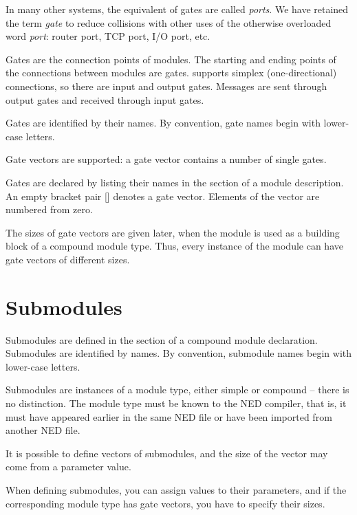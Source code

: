 \begin{note}
    In many other systems, the equivalent of {\opp} gates are called
    \textit{ports}. We have retained the term \textit{gate} to reduce
    collisions with other uses of the otherwise overloaded word
    \textit{port}: router port, TCP port, I/O port, etc.
\end{note}



Gates are the connection points of modules. The starting and
ending points of the connections between modules are gates. {\opp}
supports simplex (one-directional) connections, so there are
input and output gates. Messages are sent through
output gates and received through input gates.

Gates are identified by their names.
By convention, gate names begin with lower-case letters.

Gate vectors are supported: a gate vector
contains a number of single gates.

Gates are declared by listing their names in the
 section of a module description. An
empty bracket pair [] denotes a gate vector.
Elements of the vector are numbered from zero.


The sizes of gate vectors are given later, when the module is used as
a building block of a compound module type. Thus, every instance of
the module can have gate vectors of different sizes.


\section{Submodules}

Submodules are defined in the
 section of a compound
module declaration. Submodules are identified by names.
By convention, submodule names begin with lower-case letters.

Submodules are instances of a module type, either simple
or compound -- there is no distinction. The module type
must be known to the NED compiler, that is, it must have appeared
earlier in the same NED file or have been imported from another
NED file.

It is possible to define vectors of submodules, and the
size of the vector may come from a parameter value.

When defining submodules, you can assign values to their
parameters, and if the corresponding module type has gate vectors,
you have to specify their sizes.


